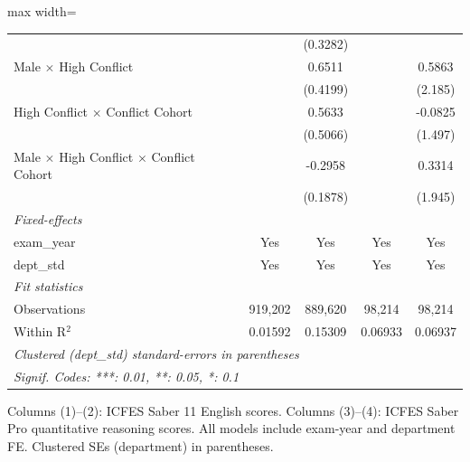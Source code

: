 \begin{table}[htbp]
\begin{adjustbox}{max width=\textwidth}
\begin{tabular}{lcccc}
                                                             &                & (0.3282)       &                &   \\   
      Male $\times$ High Conflict                            &                & 0.6511         &                & 0.5863\\   
                                                             &                & (0.4199)       &                & (2.185)\\   
      High Conflict $\times$ Conflict Cohort                 &                & 0.5633         &                & -0.0825\\   
                                                             &                & (0.5066)       &                & (1.497)\\   
      Male $\times$ High Conflict $\times$ Conflict Cohort   &                & -0.2958        &                & 0.3314\\   
                                                             &                & (0.1878)       &                & (1.945)\\   
      \midrule
      \emph{Fixed-effects}\\
      exam\_year                                             & Yes            & Yes            & Yes            & Yes\\  
      dept\_std                                              & Yes            & Yes            & Yes            & Yes\\  
      \midrule
      \emph{Fit statistics}\\
      Observations                                           & 919,202        & 889,620        & 98,214         & 98,214\\  
      Within R$^2$                                           & 0.01592        & 0.15309        & 0.06933        & 0.06937\\  
      \midrule \midrule
      \multicolumn{5}{l}{\emph{Clustered (dept\_std) standard-errors in parentheses}}\\
      \multicolumn{5}{l}{\emph{Signif. Codes: ***: 0.01, **: 0.05, *: 0.1}}\\
   \end{tabular}
   \end{adjustbox}

   \par \raggedright \small
   Columns (1)--(2): ICFES Saber 11 English scores. Columns (3)--(4): ICFES Saber Pro quantitative reasoning scores. All models include exam-year and department FE. Clustered SEs (department) in parentheses.
\end{table}


